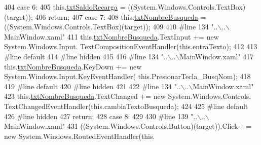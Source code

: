 \begin{DoxyCode}
404             \textcolor{keywordflow}{case} 6:
405             this.\hyperlink{class_proyecto___integrador__3_1_1_main_window_aeb68364159bb1ed1dbf417a205fd3519}{txtSaldoRecarga} = ((System.Windows.Controls.TextBox)(target));
406             \textcolor{keywordflow}{return};
407             \textcolor{keywordflow}{case} 7:
408             this.\hyperlink{class_proyecto___integrador__3_1_1_main_window_a8b7a97d30e0788fb2ff72eaee1d0ab88}{txtNombreBusqueda} = ((System.Windows.Controls.TextBox)(target));
409             
410 \textcolor{preprocessor}{            #line 134 "..\(\backslash\)..\(\backslash\)MainWindow.xaml"}
411 \textcolor{preprocessor}{}            this.\hyperlink{class_proyecto___integrador__3_1_1_main_window_a8b7a97d30e0788fb2ff72eaee1d0ab88}{txtNombreBusqueda}.TextInput += \textcolor{keyword}{new} System.Windows.Input.
      TextCompositionEventHandler(this.entraTexto);
412             
413 \textcolor{preprocessor}{            #line default}
414 \textcolor{preprocessor}{}\textcolor{preprocessor}{            #line hidden}
415 \textcolor{preprocessor}{}            
416 \textcolor{preprocessor}{            #line 134 "..\(\backslash\)..\(\backslash\)MainWindow.xaml"}
417 \textcolor{preprocessor}{}            this.\hyperlink{class_proyecto___integrador__3_1_1_main_window_a8b7a97d30e0788fb2ff72eaee1d0ab88}{txtNombreBusqueda}.KeyDown += \textcolor{keyword}{new} System.Windows.Input.KeyEventHandler(
      this.PresionarTecla\_BusqNom);
418             
419 \textcolor{preprocessor}{            #line default}
420 \textcolor{preprocessor}{}\textcolor{preprocessor}{            #line hidden}
421 \textcolor{preprocessor}{}            
422 \textcolor{preprocessor}{            #line 134 "..\(\backslash\)..\(\backslash\)MainWindow.xaml"}
423 \textcolor{preprocessor}{}            this.\hyperlink{class_proyecto___integrador__3_1_1_main_window_a8b7a97d30e0788fb2ff72eaee1d0ab88}{txtNombreBusqueda}.TextChanged += \textcolor{keyword}{new} System.Windows.Controls.
      TextChangedEventHandler(this.cambiaTextoBusqueda);
424             
425 \textcolor{preprocessor}{            #line default}
426 \textcolor{preprocessor}{}\textcolor{preprocessor}{            #line hidden}
427 \textcolor{preprocessor}{}            \textcolor{keywordflow}{return};
428             \textcolor{keywordflow}{case} 8:
429             
430 \textcolor{preprocessor}{            #line 139 "..\(\backslash\)..\(\backslash\)MainWindow.xaml"}
431 \textcolor{preprocessor}{}            ((System.Windows.Controls.Button)(target)).Click += \textcolor{keyword}{new} System.Windows.RoutedEventHandler(\textcolor{keyword}{this}.

\end{DoxyCode}
